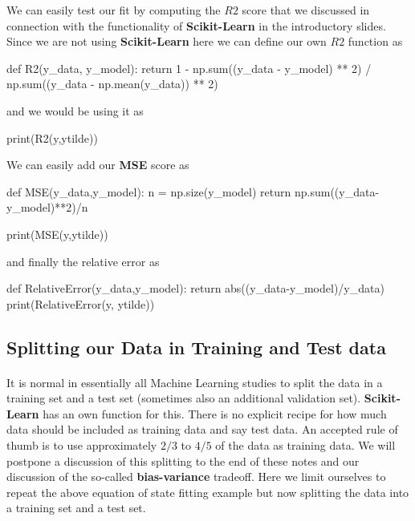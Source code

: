 \documentclass[%
oneside,                 %
final,                   %
10pt]{article}
\begin{document}
We can easily test our fit by computing the $R2$ score that we discussed in connection with the functionality of \textbf{Scikit-Learn} in the introductory slides.
Since we are not using \textbf{Scikit-Learn} here we can define our own $R2$ function as



\bpycod
def R2(y_data, y_model):
    return 1 - np.sum((y_data - y_model) ** 2) / np.sum((y_data - np.mean(y_data)) ** 2)

\epycod

and we would be using it as 


\bpycod
print(R2(y,ytilde))

\epycod


We can easily add our \textbf{MSE} score as






\bpycod
def MSE(y_data,y_model):
    n = np.size(y_model)
    return np.sum((y_data-y_model)**2)/n

print(MSE(y,ytilde))

\epycod

and finally the relative error as




\bpycod
def RelativeError(y_data,y_model):
    return abs((y_data-y_model)/y_data)
print(RelativeError(y, ytilde))

\epycod


\subsection{Splitting our Data in Training and Test data}


\paragraph{}

It is normal in essentially all Machine Learning studies to split the
data in a training set and a test set (sometimes also an additional
validation set).  \textbf{Scikit-Learn} has an own function for this. There
is no explicit recipe for how much data should be included as training
data and say test data.  An accepted rule of thumb is to use
approximately $2/3$ to $4/5$ of the data as training data. We will
postpone a discussion of this splitting to the end of these notes and
our discussion of the so-called \textbf{bias-variance} tradeoff. Here we
limit ourselves to repeat the above equation of state fitting example
but now splitting the data into a training set and a test set.
\end{document}

